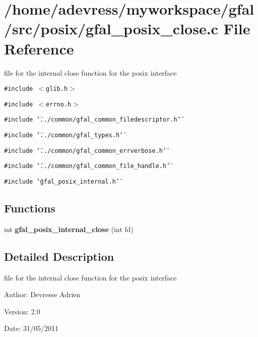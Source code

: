 \section{/home/adevress/myworkspace/gfal/src/posix/gfal\_\-posix\_\-close.c File Reference}
\label{gfal__posix__close_8c}
file for the internal close function for the posix interface 

{\tt \#include $<$glib.h$>$}\par
{\tt \#include $<$errno.h$>$}\par
{\tt \#include \char`\"{}../common/gfal\_\-common\_\-filedescriptor.h\char`\"{}}\par
{\tt \#include \char`\"{}../common/gfal\_\-types.h\char`\"{}}\par
{\tt \#include \char`\"{}../common/gfal\_\-common\_\-errverbose.h\char`\"{}}\par
{\tt \#include \char`\"{}../common/gfal\_\-common\_\-file\_\-handle.h\char`\"{}}\par
{\tt \#include \char`\"{}gfal\_\-posix\_\-internal.h\char`\"{}}\par
\subsection*{Functions}
\begin{CompactItemize}
\item 
int \textbf{gfal\_\-posix\_\-internal\_\-close} (int fd)\label{gfal__posix__close_8c_9cfa5dfe3dff862999ce8f5c5b62a0c4}

\end{CompactItemize}


\subsection{Detailed Description}
file for the internal close function for the posix interface 

\begin{Desc}
\item[Author:]Devresse Adrien \end{Desc}
\begin{Desc}
\item[Version:]2.0 \end{Desc}
\begin{Desc}
\item[Date:]31/05/2011 \end{Desc}
